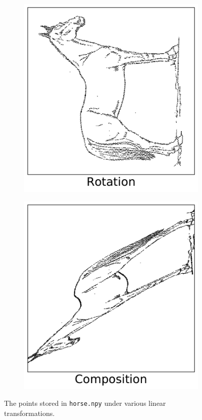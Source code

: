 \begin{figure}[h]
\begin{subfigure}{.32\textwidth}
\end{subfigure}
%
\begin{subfigure}{.32\textwidth}
    \centering
    \includegraphics[width=\linewidth]{RotationHorse.pdf}
\end{subfigure}
%
\begin{subfigure}{.32\textwidth}
    \centering
    \includegraphics[width=\linewidth]{CompositionHorse.pdf} %
\end{subfigure}
\caption{The points stored in \texttt{horse.npy} under various linear transformations.}
\label{fig:linearly-transformed-horses}
\end{figure}

